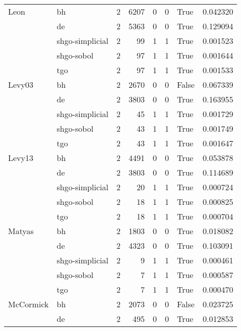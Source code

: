 \begin{longtable}{llrrrrlr}
Leon & bh &     2 &     6207 &      0 &       0 &    True &    0.042320 \\
         & de &     2 &     5363 &      0 &       0 &    True &    0.129094 \\
         & shgo-simplicial &     2 &       99 &      1 &       1 &    True &    0.001523 \\
         & shgo-sobol &     2 &       97 &      1 &       1 &    True &    0.001644 \\
         & tgo &     2 &       97 &      1 &       1 &    True &    0.001533 \\
Levy03 & bh &     2 &     2670 &      0 &       0 &   False &    0.067339 \\
         & de &     2 &     3803 &      0 &       0 &    True &    0.163955 \\
         & shgo-simplicial &     2 &       45 &      1 &       1 &    True &    0.001729 \\
         & shgo-sobol &     2 &       43 &      1 &       1 &    True &    0.001749 \\
         & tgo &     2 &       43 &      1 &       1 &    True &    0.001647 \\
Levy13 & bh &     2 &     4491 &      0 &       0 &    True &    0.053878 \\
         & de &     2 &     3803 &      0 &       0 &    True &    0.114689 \\
         & shgo-simplicial &     2 &       20 &      1 &       1 &    True &    0.000724 \\
         & shgo-sobol &     2 &       18 &      1 &       1 &    True &    0.000825 \\
         & tgo &     2 &       18 &      1 &       1 &    True &    0.000704 \\
Matyas & bh &     2 &     1803 &      0 &       0 &    True &    0.018082 \\
         & de &     2 &     4323 &      0 &       0 &    True &    0.103091 \\
         & shgo-simplicial &     2 &        9 &      1 &       1 &    True &    0.000461 \\
         & shgo-sobol &     2 &        7 &      1 &       1 &    True &    0.000587 \\
         & tgo &     2 &        7 &      1 &       1 &    True &    0.000470 \\
McCormick & bh &     2 &     2073 &      0 &       0 &   False &    0.023725 \\
         & de &     2 &      495 &      0 &       0 &    True &    0.012853 \\

\end{longtable}
